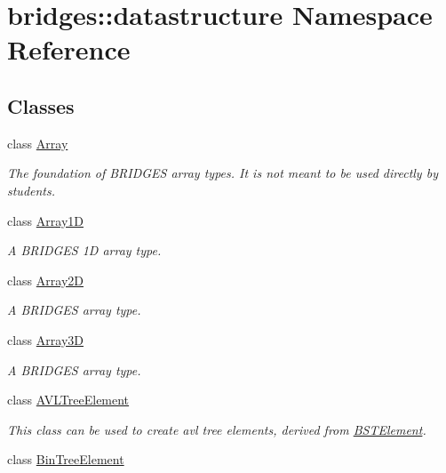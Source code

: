 \hypertarget{namespacebridges_1_1datastructure}{}\section{bridges\+::datastructure Namespace Reference}
\label{namespacebridges_1_1datastructure}
\subsection*{Classes}
\begin{DoxyCompactItemize}
\item 
class \mbox{\hyperlink{classbridges_1_1datastructure_1_1_array}{Array}}
\begin{DoxyCompactList}\small\item\em The foundation of B\+R\+I\+D\+G\+ES array types. It is not meant to be used directly by students. \end{DoxyCompactList}\item 
class \mbox{\hyperlink{classbridges_1_1datastructure_1_1_array1_d}{Array1D}}
\begin{DoxyCompactList}\small\item\em A B\+R\+I\+D\+G\+ES 1D array type. \end{DoxyCompactList}\item 
class \mbox{\hyperlink{classbridges_1_1datastructure_1_1_array2_d}{Array2D}}
\begin{DoxyCompactList}\small\item\em A B\+R\+I\+D\+G\+ES array type. \end{DoxyCompactList}\item 
class \mbox{\hyperlink{classbridges_1_1datastructure_1_1_array3_d}{Array3D}}
\begin{DoxyCompactList}\small\item\em A B\+R\+I\+D\+G\+ES array type. \end{DoxyCompactList}\item 
class \mbox{\hyperlink{classbridges_1_1datastructure_1_1_a_v_l_tree_element}{A\+V\+L\+Tree\+Element}}
\begin{DoxyCompactList}\small\item\em This class can be used to create avl tree elements, derived from \mbox{\hyperlink{classbridges_1_1datastructure_1_1_b_s_t_element}{B\+S\+T\+Element}}. \end{DoxyCompactList}\item 
class \mbox{\hyperlink{classbridges_1_1datastructure_1_1_bin_tree_element}{Bin\+Tree\+Element}}

\end{DoxyCompactItemize}
